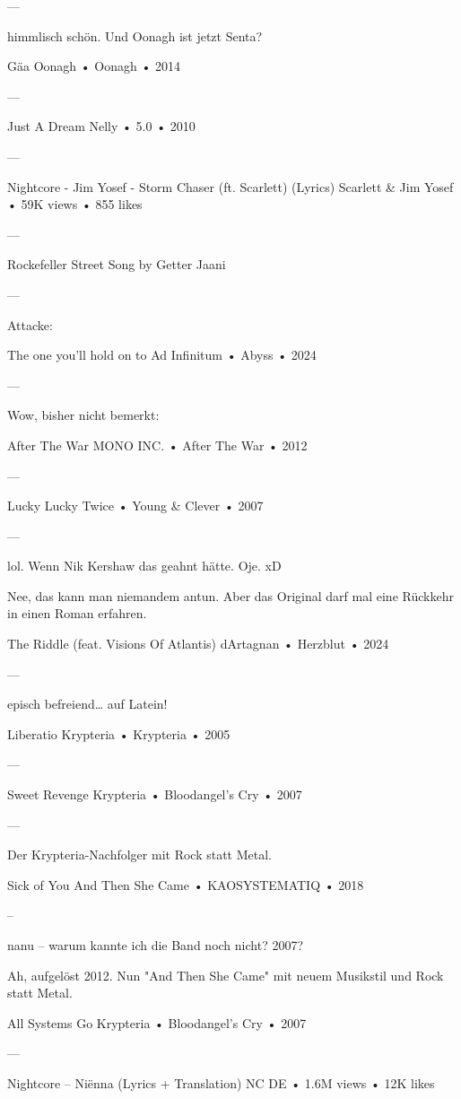 —

himmlisch schön.
Und Oonagh ist jetzt Senta?

Gäa
Oonagh
 •
Oonagh
 •
2014

—

Just A Dream
Nelly
 •
5.0
 •
2010

—

Nightcore - Jim Yosef - Storm Chaser (ft. Scarlett) (Lyrics)
Scarlett
 &
Jim Yosef
 •
59K views
 •
855 likes

—

Rockefeller Street
Song by Getter Jaani

—

Attacke:

The one you'll hold on to
Ad Infinitum
 •
Abyss
 •
2024


—

Wow, bisher nicht bemerkt:

After The War
MONO INC.
 •
After The War
 •
2012

—

Lucky
Lucky Twice
 •
Young & Clever
 •
2007

—

lol. Wenn Nik Kershaw das geahnt hätte.
Oje. xD

Nee, das kann man niemandem antun. Aber das Original darf mal eine Rückkehr in einen Roman erfahren.

The Riddle (feat. Visions Of Atlantis)
dArtagnan
 •
Herzblut
 •
2024


—

episch befreiend… auf Latein!

Liberatio
Krypteria
 •
Krypteria
 •
2005

—

Sweet Revenge
Krypteria
 •
Bloodangel's Cry
 •
2007

—

Der Krypteria-Nachfolger mit Rock statt Metal.

Sick of You
And Then She Came
 •
KAOSYSTEMATIQ
 •
2018

–

nanu – warum kannte ich die Band noch nicht? 2007?

Ah, aufgelöst 2012. Nun "And Then She Came" mit neuem Musikstil und Rock statt Metal.

All Systems Go
Krypteria
 •
Bloodangel's Cry
 •
2007


—

Nightcore – Niënna (Lyrics + Translation)
NC DE
 •
1.6M views
 •
12K likes


